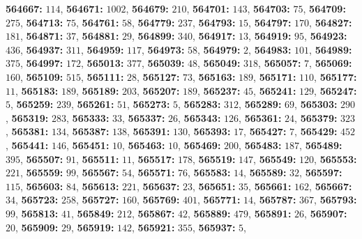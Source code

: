 \textsf{\bfseries 564667:} $114$, \textsf{\bfseries 564671:} $1002$, \textsf{\bfseries 564679:} $210$, \textsf{\bfseries 564701:} $143$, \textsf{\bfseries 564703:} $75$, \textsf{\bfseries 564709:} $275$, \textsf{\bfseries 564713:} $75$, \textsf{\bfseries 564761:} $58$, \textsf{\bfseries 564779:} $237$, \textsf{\bfseries 564793:} $15$, \textsf{\bfseries 564797:} $170$, \textsf{\bfseries 564827:} $181$, \textsf{\bfseries 564871:} $37$, \textsf{\bfseries 564881:} $29$, \textsf{\bfseries 564899:} $340$, \textsf{\bfseries 564917:} $13$, \textsf{\bfseries 564919:} $95$, \textsf{\bfseries 564923:} $436$, \textsf{\bfseries 564937:} $311$, \textsf{\bfseries 564959:} $117$, \textsf{\bfseries 564973:} $58$, \textsf{\bfseries 564979:} $2$, \textsf{\bfseries 564983:} $101$, \textsf{\bfseries 564989:} $375$, \textsf{\bfseries 564997:} $172$, \textsf{\bfseries 565013:} $377$, \textsf{\bfseries 565039:} $48$, \textsf{\bfseries 565049:} $318$, \textsf{\bfseries 565057:} $7$, \textsf{\bfseries 565069:} $160$, \textsf{\bfseries 565109:} $515$, \textsf{\bfseries 565111:} $28$, \textsf{\bfseries 565127:} $73$, \textsf{\bfseries 565163:} $189$, \textsf{\bfseries 565171:} $110$, \textsf{\bfseries 565177:} $11$, \textsf{\bfseries 565183:} $189$, \textsf{\bfseries 565189:} $203$, \textsf{\bfseries 565207:} $189$, \textsf{\bfseries 565237:} $45$, \textsf{\bfseries 565241:} $129$, \textsf{\bfseries 565247:} $5$, \textsf{\bfseries 565259:} $239$, \textsf{\bfseries 565261:} $51$, \textsf{\bfseries 565273:} $5$, \textsf{\bfseries 565283:} $312$, \textsf{\bfseries 565289:} $69$, \textsf{\bfseries 565303:} $290$, \textsf{\bfseries 565319:} $283$, \textsf{\bfseries 565333:} $33$, \textsf{\bfseries 565337:} $26$, \textsf{\bfseries 565343:} $126$, \textsf{\bfseries 565361:} $24$, \textsf{\bfseries 565379:} $323$, \textsf{\bfseries 565381:} $134$, \textsf{\bfseries 565387:} $138$, \textsf{\bfseries 565391:} $130$, \textsf{\bfseries 565393:} $17$, \textsf{\bfseries 565427:} $7$, \textsf{\bfseries 565429:} $452$, \textsf{\bfseries 565441:} $146$, \textsf{\bfseries 565451:} $10$, \textsf{\bfseries 565463:} $10$, \textsf{\bfseries 565469:} $200$, \textsf{\bfseries 565483:} $187$, \textsf{\bfseries 565489:} $395$, \textsf{\bfseries 565507:} $91$, \textsf{\bfseries 565511:} $11$, \textsf{\bfseries 565517:} $178$, \textsf{\bfseries 565519:} $147$, \textsf{\bfseries 565549:} $120$, \textsf{\bfseries 565553:} $221$, \textsf{\bfseries 565559:} $99$, \textsf{\bfseries 565567:} $54$, \textsf{\bfseries 565571:} $76$, \textsf{\bfseries 565583:} $14$, \textsf{\bfseries 565589:} $32$, \textsf{\bfseries 565597:} $115$, \textsf{\bfseries 565603:} $84$, \textsf{\bfseries 565613:} $221$, \textsf{\bfseries 565637:} $23$, \textsf{\bfseries 565651:} $35$, \textsf{\bfseries 565661:} $162$, \textsf{\bfseries 565667:} $34$, \textsf{\bfseries 565723:} $258$, \textsf{\bfseries 565727:} $160$, \textsf{\bfseries 565769:} $401$, \textsf{\bfseries 565771:} $14$, \textsf{\bfseries 565787:} $367$, \textsf{\bfseries 565793:} $99$, \textsf{\bfseries 565813:} $41$, \textsf{\bfseries 565849:} $212$, \textsf{\bfseries 565867:} $42$, \textsf{\bfseries 565889:} $479$, \textsf{\bfseries 565891:} $26$, \textsf{\bfseries 565907:} $20$, \textsf{\bfseries 565909:} $29$, \textsf{\bfseries 565919:} $142$, \textsf{\bfseries 565921:} $355$, \textsf{\bfseries 565937:} $5$, 
